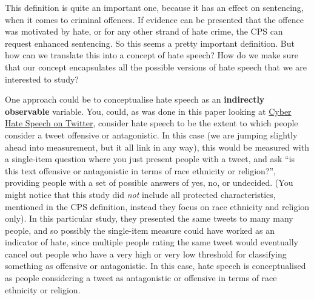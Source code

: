 \documentclass[
]{book}
\begin{document}
This definition is quite an important one, because it has an effect on sentencing, when it comes to criminal offences. If evidence can be presented that the offence was motivated by hate, or for any other strand of hate crime, the CPS can request enhanced sentencing. So this seems a pretty important definition. But how can we translate this into a concept of hate speech? How do we make sure that our concept encapsulates all the possible versions of hate speech that we are interested to study?

One approach could be to conceptualise hate speech as an \textbf{indirectly observable} variable. You, could, as was done in this paper looking at \href{http://onlinelibrary.wiley.com/doi/10.1002/poi3.85/full}{Cyber Hate Speech on Twitter}, consider hate speech to be the extent to which people consider a tweet offensive or antagonistic. In this case (we are jumping slightly ahead into measurement, but it all link in any way), this would be measured with a single-item question where you just present people with a tweet, and ask ``is this text offensive or antagonistic in terms of race ethnicity or religion?'', providing people with a set of possible answers of yes, no, or undecided. (You might notice that this study did \emph{not} include all protected characteristics, mentioned in the CPS definition, instead they focus on race ethnicity and religion only). In this particular study, they presented the same tweets to many many people, and so possibly the single-item measure could have worked as an indicator of hate, since multiple people rating the same tweet would eventually cancel out people who have a very high or very low threshold for classifying something as offensive or antagonistic. In this case, hate speech is conceptualised as people considering a tweet as antagonistic or offensive in terms of race ethnicity or religion.
\end{document}
